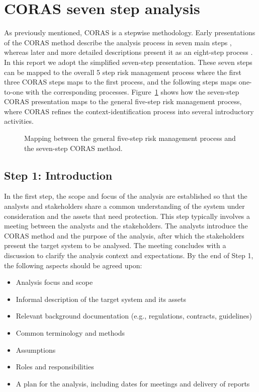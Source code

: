 \section{CORAS seven step analysis}
As previously mentioned, CORAS is a stepwise methodology. Early presentations of the CORAS method describe the analysis process in seven main steps \citep{braber_model-based_2007}, whereas later and more detailed descriptions present it as an eight-step process \citep{lund_model-driven_2011}. In this report we adopt the simplified seven-step presentation. These seven steps can be mapped to the overall 5 step risk management process where the first three CORAS steps maps to the first process, and the following steps maps one-to-one with the corresponding processes. Figure~\ref{fig:coras_mapping} shows how the seven-step CORAS presentation maps to the general five-step risk management process, where CORAS refines the context-identification process into several introductory activities.

\begin{figure}[htbp]
  \centering
  \resizebox{0.85\textwidth}{!}{
    
  }
  \caption{Mapping between the general five-step risk management process and the seven-step CORAS method.}
  \label{fig:coras_mapping}
\end{figure}

\subsection{Step 1: Introduction}
In the first step, the scope and focus of the analysis are established so that the analysts and stakeholders share a common understanding of the system under consideration and the assets that need protection. This step typically involves a meeting between the analysts and the stakeholders. The analysts introduce the CORAS method and the purpose of the analysis, after which the stakeholders present the target system to be analysed. The meeting concludes with a discussion to clarify the analysis context and expectations. By the end of Step 1, the following aspects should be agreed upon:

\begin{itemize}
  \item Analysis focus and scope
  \item Informal description of the target system and its assets
  \item Relevant background documentation (e.g., regulations, contracts, guidelines)
  \item Common terminology and methods
  \item Assumptions
  \item Roles and responsibilities
  \item A plan for the analysis, including dates for meetings and delivery of reports
\end{itemize}

